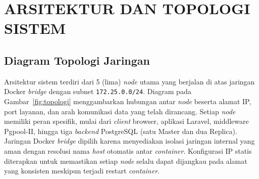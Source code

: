\chapter{ARSITEKTUR DAN TOPOLOGI SISTEM}

\section{Diagram Topologi Jaringan}

Arsitektur sistem terdiri dari 5 (lima) \textit{node} utama yang
berjalan di atas jaringan Docker \textit{bridge} dengan subnet
\texttt{172.25.0.0/24}. Diagram pada Gambar~\ref{fig:topologi}
menggambarkan hubungan antar \textit{node} beserta alamat IP, port
layanan, dan arah komunikasi data yang telah dirancang. Setiap
\textit{node} memiliki peran spesifik, mulai dari \textit{client}
browser, aplikasi Laravel, middleware Pgpool-II, hingga tiga
\textit{backend} PostgreSQL (satu Master dan dua Replica). Jaringan
Docker \textit{bridge} dipilih karena menyediakan isolasi jaringan
internal yang aman dengan resolusi nama \textit{host} otomatis antar
\textit{container}. Konfigurasi IP statis diterapkan untuk memastikan
setiap \textit{node} selalu dapat dijangkau pada alamat yang konsisten
meskipun terjadi restart \textit{container}.

